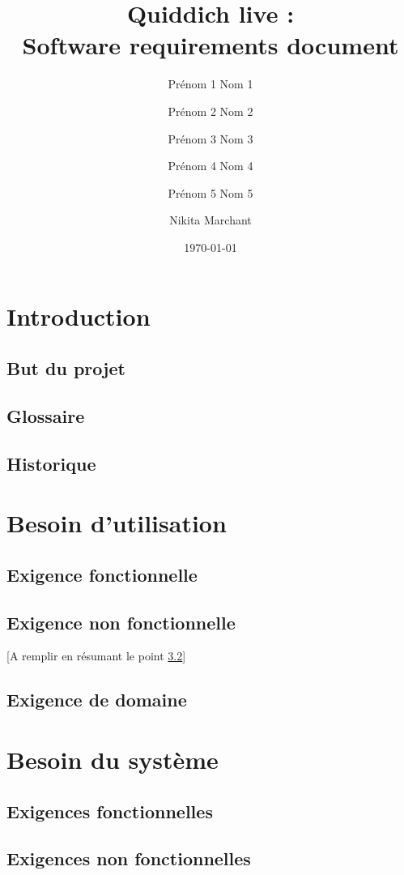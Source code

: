 \documentclass[a4paper]{article}
\title{Quiddich live : \\Software requirements document}
\author{Prénom 1 Nom 1 \and Prénom 2 Nom 2 \and Prénom 3 Nom 3 \and
Prénom 4 Nom 4 \and Prénom 5 Nom 5 \and Nikita Marchant}
\date{\today}
\begin{document}
\maketitle

\section{Introduction}
\subsection{But du projet}
\subsection{ Glossaire}
\subsection{Historique}
\section{Besoin d'utilisation}
\subsection{Exigence fonctionnelle}
\subsection{Exigence non fonctionnelle}
[A remplir en résumant le point \ref{enf}]
\subsection{Exigence de domaine}
\section{Besoin du système}
\subsection{Exigences fonctionnelles}
\subsection{Exigences non fonctionnelles}
\label{enf}
\end{document}
